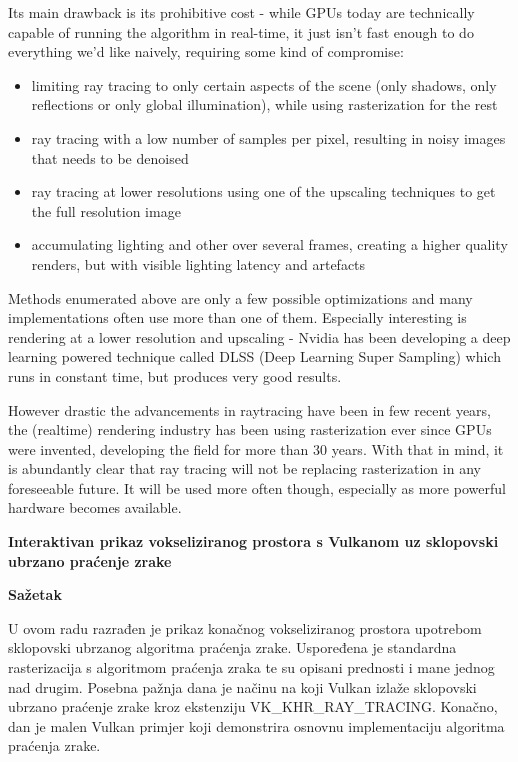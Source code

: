 \documentclass[times, utf8, zavrsni, numeric]{fer}
\begin{document}
Its main drawback is its prohibitive cost - while GPUs today are technically capable of running the algorithm in real-time, it just isn't fast enough to do everything we'd like naively, requiring some kind of compromise:
\begin{itemize}
	\item limiting ray tracing to only certain aspects of the scene (only shadows, only reflections or only global illumination), while using rasterization for the rest
	\item ray tracing with a low number of samples per pixel, resulting in noisy images that needs to be denoised
	\item ray tracing at lower resolutions using one of the upscaling techniques to get the full resolution image
	\item accumulating lighting and other over several frames, creating a higher quality renders, but with visible lighting latency and artefacts
\end{itemize}

Methods enumerated above are only a few possible optimizations and many implementations often use more than one of them. Especially interesting is rendering at a lower resolution and upscaling - Nvidia has been developing a deep learning powered technique called DLSS (Deep Learning Super Sampling) which runs in constant time, but produces very good results.

However drastic the advancements in raytracing have been in few recent years, the (realtime) rendering industry has been using rasterization ever since GPUs were invented, developing the field for more than 30 years. With that in mind, it is abundantly clear that ray tracing will not be replacing rasterization in any foreseeable future. It will be used more often though, especially as more powerful hardware becomes available.




\newpage
\vspace*{\fill}
\thispagestyle{empty}
\begin{center}
	{\bf Interaktivan prikaz vokseliziranog prostora s Vulkanom uz sklopovski ubrzano praćenje zrake}
\end{center}
\hspace*{\fill} {\bf Sa\v{z}etak} \hspace*{\fill} \par
\vspace*{25pt}

U ovom radu razrađen je prikaz konačnog vokseliziranog prostora upotrebom sklopovski ubrzanog algoritma praćenja zrake. Uspoređena je standardna rasterizacija s algoritmom praćenja zraka te su opisani prednosti i mane jednog nad drugim. Posebna pažnja dana je načinu na koji Vulkan izlaže sklopovski ubrzano praćenje zrake kroz ekstenziju VK\_KHR\_RAY\_TRACING. Konačno, dan je malen Vulkan primjer koji demonstrira osnovnu implementaciju algoritma praćenja zrake.
\end{document}
